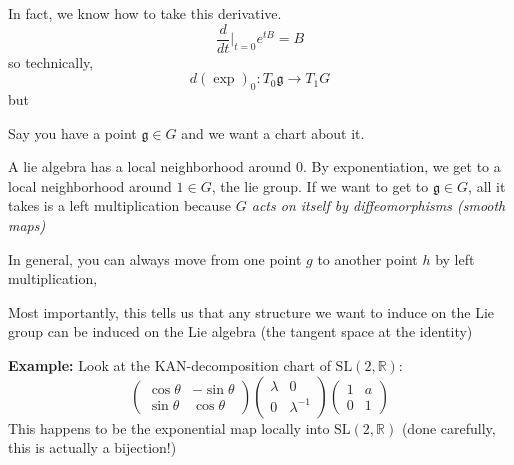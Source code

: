 \documentclass[12pt]{article}
\newcommand{\R}{\mathbb{R}}
\newcommand{\SL}{\text{SL}}
\begin{document}
    In fact, we know how to take this derivative. 
    \[\frac{d}{dt}\bigg\vert_{t=0} e^{tB} = B\]
    so technically, 
    \[d(\exp)_0: T_0\mathfrak{g}\to T_1G\] 
    but 

    Say you have a point $\mathfrak{g} \in G$ and we want a chart about it. 
 
    A lie algebra has a local neighborhood around $0$. By exponentiation, we get to a local neighborhood around $1 \in G$, the lie group. If we want to get to $\mathfrak{g} \in G$, all it takes is a left multiplication because \emph{$G$ acts on itself by diffeomorphisms (smooth maps)}
    
    In general, you can always move from one point $g$ to another point $h$ by left multiplication,

    Most importantly, this tells us that any structure we want to induce on the Lie group can be induced on the Lie algebra (the tangent space at the identity)
     
    \textbf{Example:} Look at the KAN-decomposition chart of $\SL(2, \R)$: 
    \[\begin{pmatrix}
        \cos\theta & -\sin \theta\\ 
        \sin \theta & \cos \theta
    \end{pmatrix} \begin{pmatrix}
        \lambda & 0\\ 
        0 & \lambda^{-1}
    \end{pmatrix} \begin{pmatrix}
        1 & a\\ 
        0 & 1
    \end{pmatrix}\] 
    This happens to be the exponential map locally into $\SL(2, \R)$ (done carefully, this is actually a bijection!) 
\end{document}
